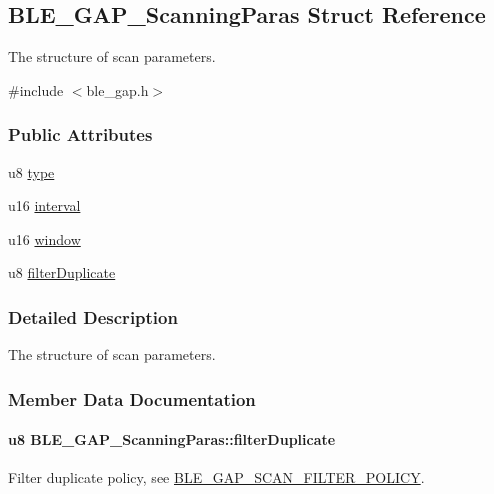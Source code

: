 \hypertarget{struct_b_l_e___g_a_p___scanning_paras}{}\subsection{B\+L\+E\+\_\+\+G\+A\+P\+\_\+\+Scanning\+Paras Struct Reference}
\label{struct_b_l_e___g_a_p___scanning_paras}


The structure of scan parameters.  




{\ttfamily \#include $<$ble\+\_\+gap.\+h$>$}

\subsubsection*{Public Attributes}
\begin{DoxyCompactItemize}
\item 
u8 \hyperlink{struct_b_l_e___g_a_p___scanning_paras_a8a71587929f154eab6853bf564525b48}{type}
\item 
u16 \hyperlink{struct_b_l_e___g_a_p___scanning_paras_a21ee18c1250e1b3c0047b1b34c15c02c}{interval}
\item 
u16 \hyperlink{struct_b_l_e___g_a_p___scanning_paras_a8385c953beffd40acae708f2c04ec114}{window}
\item 
u8 \hyperlink{struct_b_l_e___g_a_p___scanning_paras_afc0c5cdaff08fd44c088a7383f0588a3}{filter\+Duplicate}
\end{DoxyCompactItemize}


\subsubsection{Detailed Description}
The structure of scan parameters. 

\subsubsection{Member Data Documentation}
\paragraph[{\texorpdfstring{filter\+Duplicate}{filterDuplicate}}]{\setlength{\rightskip}{0pt plus 5cm}u8 B\+L\+E\+\_\+\+G\+A\+P\+\_\+\+Scanning\+Paras\+::filter\+Duplicate}\hypertarget{struct_b_l_e___g_a_p___scanning_paras_afc0c5cdaff08fd44c088a7383f0588a3}{}\label{struct_b_l_e___g_a_p___scanning_paras_afc0c5cdaff08fd44c088a7383f0588a3}
Filter duplicate policy, see \hyperlink{group___b_l_e___g_a_p___s_c_a_n___f_i_l_t_e_r___p_o_l_i_c_y}{B\+L\+E\+\_\+\+G\+A\+P\+\_\+\+S\+C\+A\+N\+\_\+\+F\+I\+L\+T\+E\+R\+\_\+\+P\+O\+L\+I\+CY}. 
